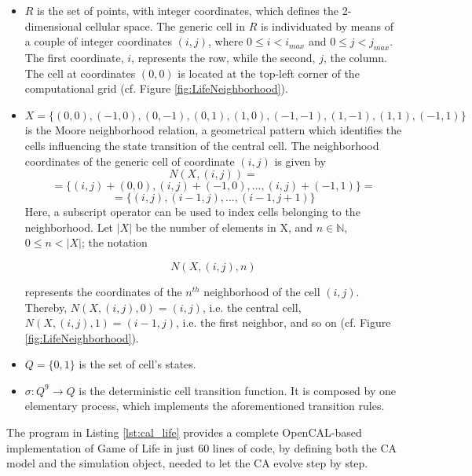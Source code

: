 \begin{itemize}

\item $R$ is the set of points, with integer coordinates, which
  defines the 2-dimensional cellular space. The generic cell in $R$ is
  individuated by means of a couple of integer coordinates $(i, j)$,
  where $0 \leq i < i_{max}$ and $0 \leq j < j_{max}$. The first
  coordinate, $i$, represents the row, while the second, $j$, the
  column. The cell at coordinates $(0,0)$ is located at the top-left
  corner of the computational grid (cf. Figure
  \ref{fig:LifeNeighborhood}).

\item $X = \{(0,0), (-1, 0), (0, -1), (0, 1), (1, 0), (-1,-1), (1,-1),
  (1,1), (-1,1)\}$ is the Moore neighborhood relation, a geometrical
  pattern which identifies the cells influencing the state transition
  of the central cell. The neighborhood coordinates of the generic
  cell of coordinate $(i, j)$ is given by
  $$N(X, (i, j)) = $$
  $$= \{(i, j)+(0,0), (i, j)+(-1, 0), \dots, (i, j)+(-1,1)\} =$$
  $$= \{(i, j), (i-1, j), \dots, (i-1,j+1)\}$$
  Here, a subscript operator can be used to index cells belonging to the
  neighborhood. Let $|X|$ be the number of elements in X, and $n \in
  \mathbb{N}$, $0 \leq n < |X|$; the notation

  $$N(X, (i, j), n)$$

  represents the coordinates of the $n^{th}$ neighborhood of the cell
  $(i,j)$. Thereby, $N(X, (i, j), 0) = (i, j)$, i.e. the central cell,
  $N(X, (i, j), 1) = (i-1, j)$, i.e. the first neighbor, and so on
  (cf. Figure \ref{fig:LifeNeighborhood}).

\item $Q = \{0, 1\}$ is the set of cell's states.

\item $\sigma : Q^9 \rightarrow Q$ is the deterministic cell
  transition function. It is composed by one elementary process, which
  implements the aforementioned transition rules.
\end{itemize}





The program in Listing \ref{lst:cal_life} provides a complete
OpenCAL-based implementation of Game of Life in just 60 lines of code,
by defining both the CA model and the simulation object, needed to let
the CA evolve step by step.


